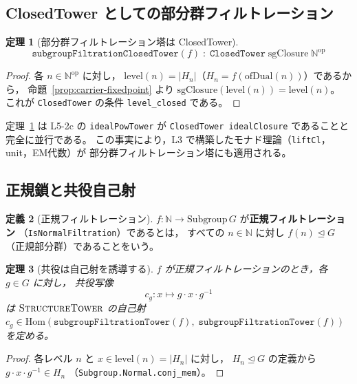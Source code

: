 \documentclass[a4paper,11pt]{ltjsarticle}
\theoremstyle{definition}
\newtheorem{definition}{定義}[section]
\theoremstyle{plain}
\newtheorem{theorem}[definition]{定理}
\theoremstyle{remark}
\newcommand{\Hom}{\mathrm{Hom}}
\newcommand{\sgcl}{\mathrm{sgClosure}}
\begin{document}
\subsection{ClosedTower としての部分群フィルトレーション}

\begin{theorem}[部分群フィルトレーション塔は ClosedTower]\label{thm:closed-tower}
  \[
    \texttt{subgroupFiltrationClosedTower}(f)
    \;:\;
    \texttt{ClosedTower}\;\sgcl\;\mathbb{N}^{\mathrm{op}}
  \]
\end{theorem}

\begin{proof}
  各 $n \in \mathbb{N}^{\mathrm{op}}$ に対し，
  $\mathrm{level}(n) = \lvert H_n \rvert$（$H_n = f(\mathrm{ofDual}(n))$）であるから，
  命題~\ref{prop:carrier-fixedpoint} より $\sgcl(\mathrm{level}(n)) = \mathrm{level}(n)$。
  これが \texttt{ClosedTower} の条件 \texttt{level\_closed} である。
\end{proof}

\begin{mathinsight}
定理~\ref{thm:closed-tower} は L5-2c の \texttt{idealPowTower} が
\texttt{ClosedTower idealClosure} であることと完全に並行である。
この事実により，L3 で構築したモナド理論（\texttt{liftCl}，unit，EM代数）が
部分群フィルトレーション塔にも適用される。
\end{mathinsight}

\subsection{正規鎖と共役自己射}

\begin{definition}[正規フィルトレーション]
  $f\colon \mathbb{N} \to \mathrm{Subgroup}\,G$ が\textbf{正規フィルトレーション}
  （\texttt{IsNormalFiltration}）であるとは，
  すべての $n \in \mathbb{N}$ に対し $f(n) \trianglelefteq G$（正規部分群）であることをいう。
\end{definition}

\begin{theorem}[共役は自己射を誘導する]\label{thm:conjugation-hom}
  $f$ が正規フィルトレーションのとき，各 $g \in G$ に対し，
  共役写像
  \[
    c_g\colon x \mapsto g \cdot x \cdot g^{-1}
  \]
  は $\textsc{StructureTower}$ の自己射
  $c_g \in \Hom(\texttt{subgroupFiltrationTower}(f),\;\texttt{subgroupFiltrationTower}(f))$
  を定める。
\end{theorem}

\begin{proof}
  各レベル $n$ と $x \in \mathrm{level}(n) = \lvert H_n \rvert$ に対し，
  $H_n \trianglelefteq G$ の定義から $g \cdot x \cdot g^{-1} \in H_n$
  （\texttt{Subgroup.Normal.conj\_mem}）。
\end{proof}
\end{document}

